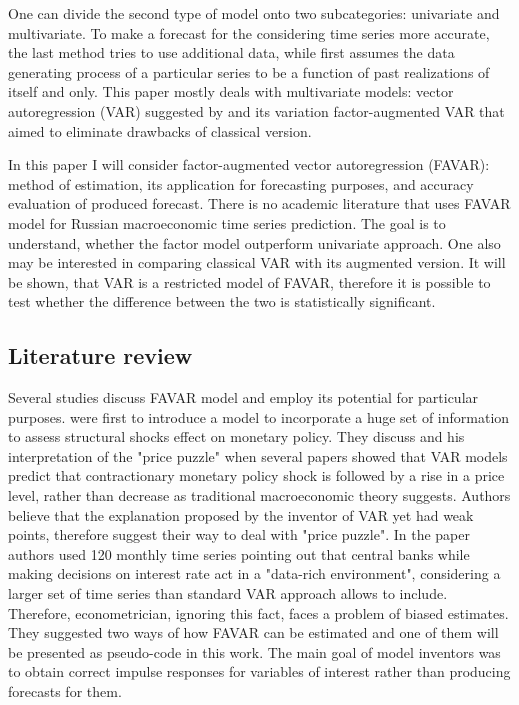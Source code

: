 \documentclass[a4paper, 14pt]{article}
\begin{document}
One can divide the second type of model onto two subcategories: univariate and multivariate. To make a forecast for the considering time series more accurate, the last method tries to use additional data, while first assumes the data generating process of a particular series to be a function of past realizations of itself and only. This paper mostly deals with multivariate models: vector autoregression (VAR) suggested by \cite{sims1980martingale} and its variation factor-augmented VAR that aimed to eliminate drawbacks of classical version.  

In this paper I will consider factor-augmented vector autoregression (FAVAR): method of estimation, its application for forecasting purposes, and accuracy evaluation of produced forecast. There is no academic literature that uses FAVAR model for Russian macroeconomic time series prediction. The goal is to understand, whether the factor model outperform univariate approach. One also may be interested in comparing classical VAR with its augmented version. It will be shown, that VAR is a restricted model of FAVAR, therefore it is possible to test whether the difference between the two is statistically significant. 
 
\subsection{Literature review}
Several studies discuss FAVAR model and employ its potential for particular purposes. \cite{bernanke2005measuring} were first to introduce a model to incorporate a huge set of information to assess structural shocks effect on monetary policy. They discuss \cite{sims1992interpreting} and his interpretation of the "price puzzle" when several papers showed that VAR models predict that contractionary monetary policy shock is followed by a rise in a price level, rather than decrease as traditional macroeconomic theory suggests. Authors believe that the explanation proposed by the inventor of VAR yet had weak points, therefore suggest their way to deal with "price puzzle". In the paper authors used 120 monthly time series pointing out that central banks while making decisions on interest rate act in a "data-rich environment", considering a larger set of time series than standard VAR approach allows to include. Therefore, econometrician, ignoring this fact, faces a problem of biased estimates. They suggested two ways of how FAVAR can be estimated and one of them will be presented as pseudo-code in this work. The main goal of model inventors was to obtain correct impulse responses for variables of interest rather than producing forecasts for them. 
\end{document}
